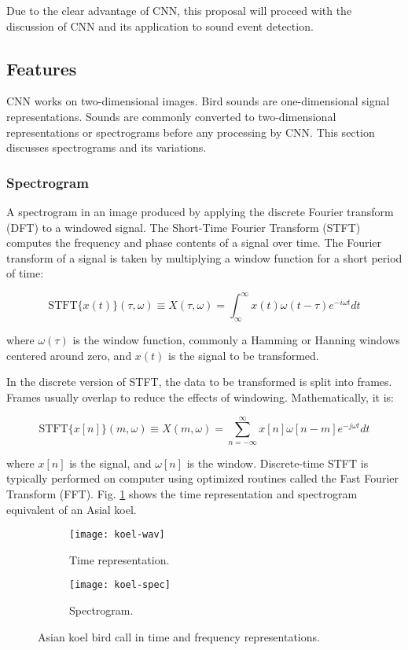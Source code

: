 Due to the clear advantage of CNN, this proposal will proceed with the discussion of CNN and its application to sound event detection.

\subsection{Features}

CNN works on two-dimensional images.
Bird sounds are one-dimensional signal representations.
Sounds are commonly converted to two-dimensional representations or spectrograms before any processing by CNN.
This section discusses spectrograms and its variations.

\subsubsection{Spectrogram}

A spectrogram in an image produced by applying the discrete Fourier transform (DFT) to a windowed signal.
The Short-Time Fourier Transform (STFT) computes the frequency and phase contents of a signal over time. 
The Fourier transform of a signal is taken by multiplying a window function for a short period of time:

\[
\mathrm{STFT}\{x(t)\}(\tau,\omega) \equiv X(\tau,\omega) = \int^\infty_\infty x(t)\omega(t-\tau)e^{-i\omega t}dt
\]

\noindent
where $\omega(\tau)$ is the window function, commonly a Hamming or Hanning windows centered around zero, and $x(t)$ is the signal to be transformed.

In the discrete version of STFT, the data to be transformed is split into frames. Frames usually overlap to reduce the effects of windowing. Mathematically, it is:

\[
\mathrm{STFT}\{x[n]\}(m,\omega) \equiv X(m,\omega) = \sum^\infty_{n=-\infty} x[n]\omega[n-m]e^{-j\omega t}dt
\]

\noindent
where $x[n]$ is the signal, and $\omega[n]$ is the window. Discrete-time STFT is typically performed on computer using optimized routines called the Fast Fourier Transform (FFT). Fig. \ref{koel} shows the time representation and spectrogram equivalent of an Asial koel.




\begin{figure}[H]
     \centering
     \begin{subfigure}[b]{0.47\textwidth}
         \centering
         \texttt{[image: koel-wav]}
         \caption{Time representation.}
     \end{subfigure}
     \hfill
     \begin{subfigure}[b]{0.47\textwidth}
         \centering
         \texttt{[image: koel-spec]}
         \caption{Spectrogram.}
     \end{subfigure}
    \caption{Asian koel bird call in time and frequency representations.}
    \label{koel}
\end{figure}



